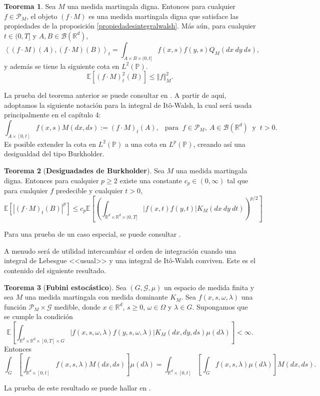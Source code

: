\documentclass[letterpaper,twoside,12pt]{book}
\newcommand{\R}{\mathbb{R}}
\newcommand{\B}{\mathcal{B}}
\newcommand{\E}{\mathbb{E}}
\renewcommand{\P}{\mathbb{P}}
\newcommand{\1}{\mathds{1}}
\newcommand{\abs}[1]{\left\lvert #1 \right\rvert}
\newcommand{\norm}[1]{\left\Vert #1 \right\Vert}
\theoremstyle{definition}
\theoremstyle{definition}
\newtheorem{teo}{Teorema}
\theoremstyle{remark}
\theoremstyle{definition}
\theoremstyle{definition}
\theoremstyle{definition}
\theoremstyle{definition}
\theoremstyle{definition}
\begin{document}
\begin{teo}\label{integralwalshgeneral}
 Sea $M$ una medida martingala digna. Entonces para cualquier $f\in \mathscr{P}_M$, el objeto $(f\cdot M)$ es una medida martingala digna que satisface las propiedades de la proposición \ref{propiedadesintegralwalsh}. Más aún, para cualquier $t\in (0,T]$ y $A,B\in \B(\R^{d})$, 
 \[
 \left\langle (f\cdot M)(A),(f\cdot M)(B)\right\rangle _t= \int_{A\times B\times (0,t]}f(x,s)f(y,s)Q_M(dx \ dy \ ds),
 \]
 y además se tiene la siguiente cota en $L^{2}(\P)$.
 \[
 \E\left[(f\cdot M)^{2}_t(B)\right] \leq \norm{f}_M^{2}.
 \]
 \end{teo}
 La prueba del teorema anterior se puede consultar en \cite[teorema 2.5]{Walsh_J.B_Introduction_to_SPDEs}. A partir de aquí, adoptamos la siguiente notación para la integral de Itô-Walsh, la cual será usada principalmente en el capítulo 4:
 \begin{equation*}
   \int_{A\times [0,t]} f(x,s) M(dx,ds):=(f\cdot M)_t(A), \ \ \text{ para } \ f\in \mathscr{P}_M, \ A\in \B(\R^{d}) \ \text{ y } \ t>0.
 \end{equation*}
  Es posible extender la cota en $L^2(\P)$ a una cota en $L^{p}(\P)$, creando así una desigualdad del tipo Burkholder.
 \begin{teo}[\textbf{Desiguadades de Burkholder}]
  Sea $M$ una medida martingala digna. Entonces para cualquier $p\geq2$ existe una constante $c_p\in (0,\infty)$ tal que para cualquier $f$ predecible y cualquier $t>0$, 
  \[
  \E\left[\abs{(f\cdot M)_t(B)}^p\right]\leq c_p \E\left[\left(\int_{\R^{d}\times \R^{d}\times (0,T]}\abs{f(x,t)f(y,t)}K_M(dx \ dy \ dt)\right)^{p/2}\right] 
  \]
  \end{teo}
  Para una prueba de un caso especial, se puede consultar \cite[teorema 5.27]{Khoshnevisan2009}. 

  A menudo será de utilidad intercambiar el orden de integración cuando una integral de Lebesgue <<usual>> y una integral de Itô-Walsh conviven. Este es el contenido del siguiente resultado.
  \begin{teo}[\textbf{Fubini estocástico}]\label{fubiniestocastico}
   Sea $(G, \mathcal{G},\mu)$ un espacio de medida finita y sea $M$ una medida martingala con medida dominante $K_M$. Sea $f(x,s,\omega, \lambda)$ una función $\mathscr{P}_M\times\mathcal{G}$ medible, donde $x\in \R^{d}$, $s\geq0$, $\omega \in \Omega$ y $\lambda \in G$. Supongamos que se cumple la condición
   \[
   \E\left[\int_{\R^{d}\times \R^{d}\times [0,T] \times G} \abs{f(x,s,\omega,\lambda)f(y,s,\omega,\lambda)}K_M(dx, dy, ds)\mu(d\lambda)\right]<\infty.
   \]
   Entonces 
   \[
   \int_G \left[\int_{\R^{d}\times [0,t]}f(x,s,\lambda)M(dx,ds)\right]\mu(d\lambda)= \int_{\R^{d}\times[0,t]}\left[\int_Gf(x,s,\lambda)\mu(d\lambda)\right] M(dx,ds).
   \]
   \end{teo}
   La prueba de este resultado se puede hallar en \cite[teorema 2.6]{Walsh_J.B_Introduction_to_SPDEs}.
\end{document}
